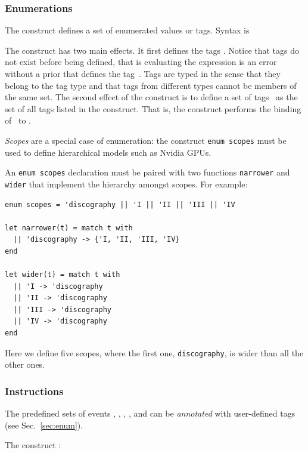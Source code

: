 \subsubsection*{\label{sec:enum}Enumerations}
The  construct defines a set of enumerated values or tags. Syntax is
\begin{center}
\end{center}
The construct has two main effects.
It first defines the tags .
Notice that tags do not exist before being defined, that is
evaluating the expression  is an error without a prior
 that defines the tag~. Tags are typed in the sense
that they belong to the tag type  and that tags from
different types cannot be members of the same set.
The second effect of the construct is to define a set of tags~
as the set of all tags listed in the construct.
That is, the  construct performs the binding of~
to .

\emph{Scopes} are a special case of enumeration: the construct {\tt enum
scopes} must be used to define hierarchical models such as Nvidia GPUs.

An {\tt enum scopes} declaration must be paired with two functions {\tt narrower} and {\tt wider} that implement the hierarchy amongst scopes. For example:

\begin{verbatim}
enum scopes = 'discography || 'I || 'II || 'III || 'IV

let narrower(t) = match t with
  || 'discography -> {'I, 'II, 'III, 'IV}
end

let wider(t) = match t with
  || 'I -> 'discography
  || 'II -> 'discography
  || 'III -> 'discography
  || 'IV -> 'discography
end
\end{verbatim}

Here we define five scopes, where the first one, {\tt discography}, is wider
than all the other ones.

\subsubsection*{Instructions}
The predefined sets of events , , ,
, and  can be \emph{annotated} with user-defined tags
(see Sec.~\ref{sec:enum}).

The construct :

